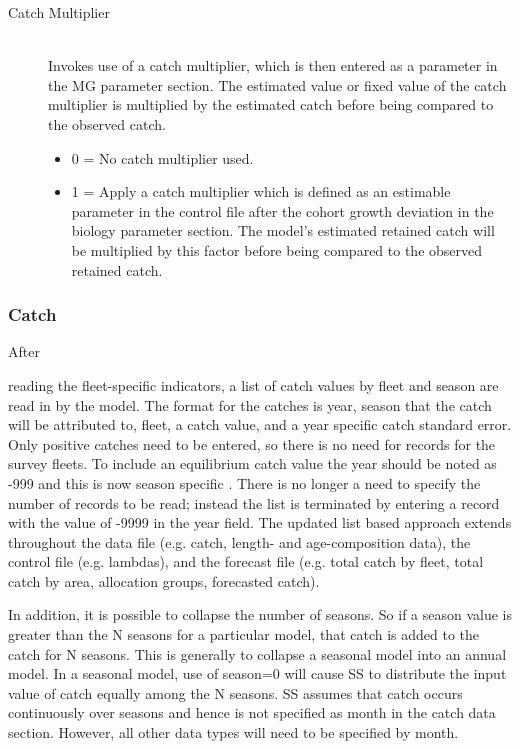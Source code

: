 \begin{description}
  \item[\hypertarget{CatchMult}{Catch Multiplier}] \hfill\\
  Invokes use of a catch multiplier, which is then entered as a parameter in the MG parameter section.  The estimated value or fixed value of the catch multiplier is multiplied by the estimated catch before being compared to the observed catch. 
	  \begin{itemize}
	  	\item 0 = No catch multiplier used.
	  	\item 1 = Apply a catch multiplier which is defined as an estimable parameter in the control file after the cohort growth deviation in the biology parameter section. The model’s estimated retained catch will be multiplied by this factor before being compared to the observed retained catch.
	  \end{itemize}  
\end{description}

\subsubsection{Catch}
\hypertarget{CatchFormat}{After} reading the fleet-specific indicators, a list of catch values by fleet and season are read in by the model.  The format for the catches is year, season that the catch will be attributed to, fleet, a catch value, and a year specific catch standard error.   Only positive catches need to be entered, so there is no need for records for the survey fleets.  To include an equilibrium catch value the year should be noted as -999 and this is now season specific .  \hypertarget{ListBased}{There} is no longer a need to specify the number of records to be read; instead the list is terminated by entering a record with the value of -9999 in the year field. The updated list based approach extends throughout the data file (e.g. catch, length- and age-composition data), the control file (e.g. lambdas), and the forecast file (e.g. total catch by fleet, total catch by area, allocation groups, forecasted catch).

In addition, it is possible to collapse the number of seasons.  So if a season value is greater than the N seasons for a particular model, that catch is added to the catch for N seasons.  This is generally to collapse a seasonal model into an annual model.  In a seasonal model, use of season=0 will cause SS to distribute the input value of catch equally among the N seasons.  SS assumes that catch occurs continuously over seasons and hence is not specified as month in the catch data section.  However, all other data types will need to be specified by month.

